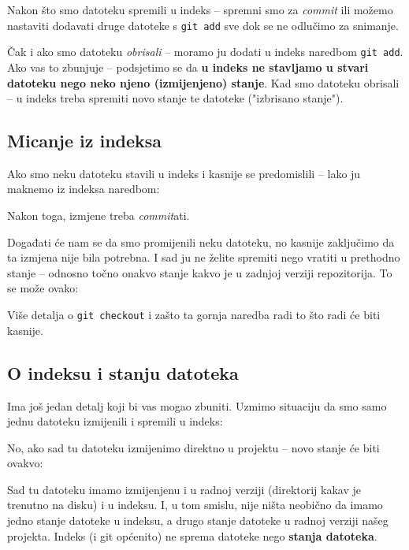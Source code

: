 Nakon što smo datoteku spremili u indeks -- spremni smo za \emph{commit} ili možemo nastaviti dodavati druge datoteke s \verb+git add+ sve dok se ne odlučimo za snimanje.

Čak i ako smo datoteku \emph{obrisali} -- moramo ju dodati u indeks naredbom \verb+git add+.
Ako vas to zbunjuje -- podsjetimo se da \textbf{u indeks ne stavljamo u stvari datoteku nego neko njeno (izmijenjeno) stanje}.
Kad smo datoteku obrisali -- u indeks treba spremiti novo stanje te datoteke ("izbrisano stanje").

\subsection*{Micanje iz indeksa}

Ako smo neku datoteku stavili u indeks i kasnije se predomislili -- lako ju maknemo iz indeksa naredbom:


Nakon toga, izmjene treba \emph{commit}ati.

Događati će nam se da smo promijenili neku datoteku, no kasnije zaključimo da ta izmjena nije bila potrebna. 
I sad ju ne želite spremiti nego vratiti u prethodno stanje -- odnosno točno onakvo stanje kakvo je u zadnjoj verziji repozitorija.
To se može ovako:


Više detalja o \verb+git checkout+ i zašto ta gornja naredba radi to što radi će biti kasnije.

\subsection*{O indeksu i stanju datoteka}

Ima još jedan detalj koji bi vas mogao zbuniti. 
Uzmimo situaciju da smo samo jednu datoteku izmijenili i spremili u indeks:



No, ako sad tu datoteku izmijenimo direktno u projektu -- novo stanje će biti ovakvo:



Sad tu datoteku imamo izmijenjenu i u radnoj verziji (direktorij kakav je trenutno na disku) i u indeksu.
I, u tom smislu, nije ništa neobično da imamo jedno stanje datoteke u indeksu, a drugo stanje datoteke u radnoj verziji našeg projekta.
Indeks (i git općenito) ne sprema datoteke nego \textbf{stanja datoteka}.

